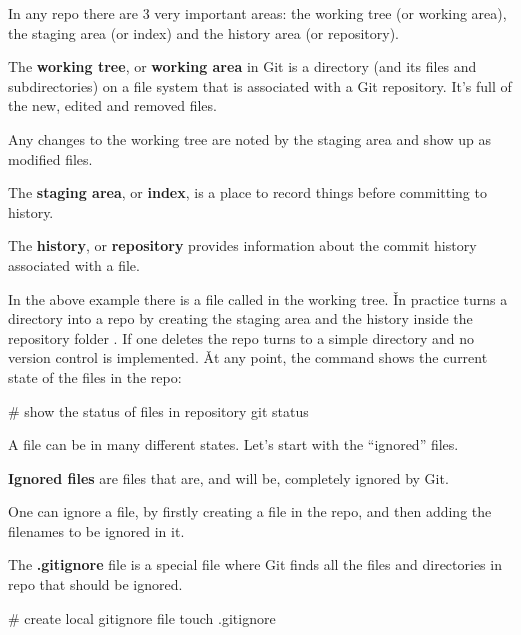 In any repo there are 3 very important areas: the working tree (or working area), the staging area (or index) and the
history area (or repository).

The \textbf{working tree}, or \textbf{working area} in Git is a directory (and its files and subdirectories) on a
file system that is associated with a Git repository. It’s full of the new, edited and removed files.
\ed

Any changes to the working tree are noted by the staging area and show up as modified files.

The \textbf{staging area}, or \textbf{index}, is a place to record things before committing to history.
\ed

The \textbf{history}, or \textbf{repository} provides information about the commit history associated with a file.
\ed


In the above example there is a file called  in the working tree. \v

In practice  turns a directory into a repo by creating the staging area and the history inside the
repository folder . If one deletes  the repo turns to a simple directory and no version control
is implemented. \v

At any point, the  command shows the current state of the files in the repo:

\begin{bash}
# show the status of files in repository
git status
\end{bash}

A file can be in many different states. Let’s start with the ``ignored'' files.

\textbf{Ignored files} are files that are, and will be, completely ignored by Git.
\ed

One can ignore a file, by firstly creating a  file in the repo, and then adding the filenames to be
ignored in it.

\bd[.gitignore]
The \textbf{.gitignore} file is a special file where Git finds all the files and directories in repo that should be
ignored.
\ed

\begin{bash}
# create local gitignore file
touch .gitignore
\end{bash}

